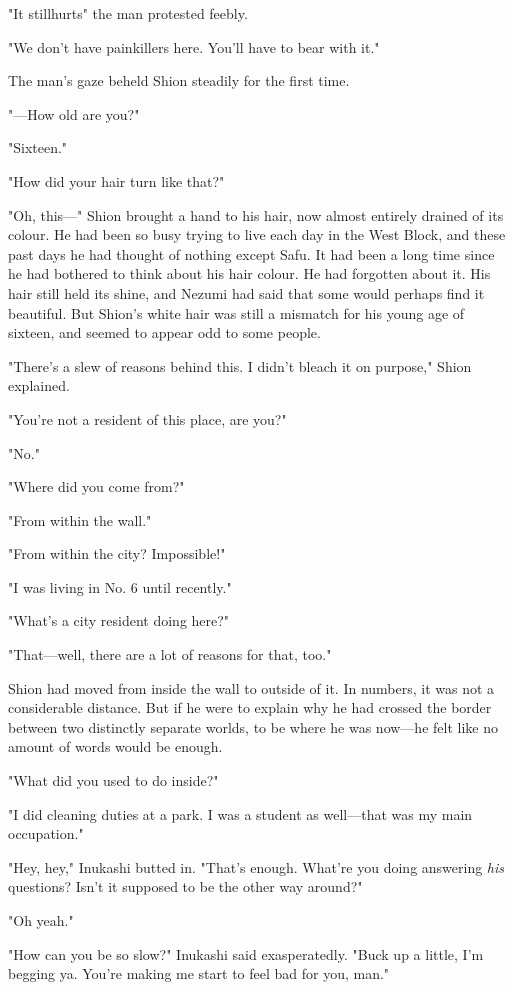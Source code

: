 "It still\el hurts\el " the man protested feebly.

"We don't have painkillers here. You'll have to bear with it."

The man's gaze beheld Shion steadily for the first time.

"---How old are you?"

"Sixteen."

"How did your hair turn like that?"

"Oh, this---" Shion brought a hand to his hair, now almost entirely
drained of its colour. He had been so busy trying to live each day in
the West Block, and these past days he had thought of nothing except
Safu. It had been a long time since he had bothered to think about his
hair colour. He had forgotten about it. His hair still held its shine,
and Nezumi had said that some would perhaps find it beautiful. But
Shion's white hair was still a mismatch for his young age of sixteen,
and seemed to appear odd to some people.

"There's a slew of reasons behind this. I didn't bleach it on purpose,"
Shion explained.

"You're not a resident of this place, are you?"

"No."

"Where did you come from?"

"From within the wall."

"From within the city? Impossible!"

"I was living in No. 6 until recently."

"What's a city resident doing here?"

"That---well, there are a lot of reasons for that, too."

Shion had moved from inside the wall to outside of it. In numbers, it
was not a considerable distance. But if he were to explain why he had
crossed the border between two distinctly separate worlds, to be where
he was now---he felt like no amount of words would be enough.

"What did you used to do inside?"

"I did cleaning duties at a park. I was a student as well---that was my
main occupation."

"Hey, hey," Inukashi butted in. "That's enough. What're you doing
answering \emph{his} questions? Isn't it supposed to be the other way around?"

"Oh yeah."

"How can you be so slow?" Inukashi said exasperatedly. "Buck up a
little, I'm begging ya. You're making me start to feel bad for you,
man."


